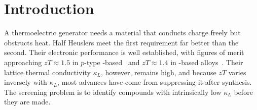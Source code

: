 %
%
%

\section{Introduction}
\label{sec:intro}

A thermoelectric generator needs a material that conducts charge freely but obstructs heat. Half
Heuslers meet the first requirement far better than the second. Their electronic performance is
well established, with figures of merit approaching $zT \approx 1.5$ in $p$-type
-based~\cite{fu2015realizing} and $zT \approx 1.4$ in -based
alloys~\cite{zhu2018discovery}. Their lattice thermal conductivity $\kappa_L$, however, remains
high, and because $zT$ varies inversely with $\kappa_L$, most advances have come from suppressing
it after synthesis. The screening problem is to identify compounds with intrinsically low
$\kappa_L$ before they are made.

